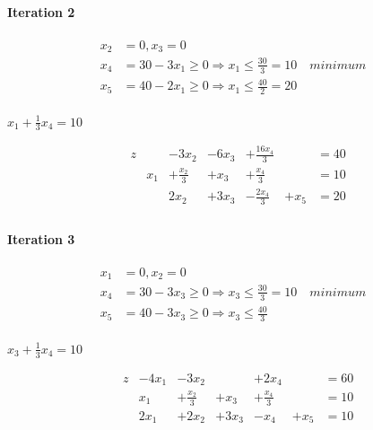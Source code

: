 \documentclass{article}
\begin{document}
\paragraph{Iteration 2}

\begin{equation}
  \begin{aligned}
    x_2 &= 0, x_3 = 0 \\
    x_4 &= 30 - 3x_1 \geq 0 \Rightarrow x_1 \leq \frac{30}{3} = 10 \quad minimum \\
    x_5 &= 40 - 2x_1 \geq 0 \Rightarrow x_1 \leq \frac{40}{2} = 20 \\
  \end{aligned}
\end{equation}

$x_1 + \frac{1}{3}x_4 = 10$

\begin{equation}
  \begin{aligned}
    &z  & &-3x_2  &-6x_3 &+\frac{16x_4}{3}{} & &= 40 \\
    & &x_1  &+\frac{x_2}{3}  &+x_3  &+\frac{x_4}{3}{} & &= 10 \\
    & &  &2x_2  &+3x_3  &-\frac{2x_4}{3}{} &+x_5 &= 20 \\
  \end{aligned}
\end{equation}

\paragraph{Iteration 3}

\begin{equation}
  \begin{aligned}
    x_1 &= 0, x_2 = 0 \\
    x_4 &= 30 - 3x_3 \geq 0 \Rightarrow x_3 \leq \frac{30}{3} = 10 \quad minimum \\
    x_5 &= 40 - 3x_3 \geq 0 \Rightarrow x_3 \leq \frac{40}{3} \\
  \end{aligned}
\end{equation}

$x_3 + \frac{1}{3}x_4 = 10$

\begin{equation}
  \begin{aligned}
    &z  &-4x_1 &-3x_2  & &+2x_4 & &= 60 \\
    & &x_1  &+\frac{x_2}{3}  &+x_3  &+\frac{x_4}{3}{} & &= 10 \\
    & &2x_1  &+2x_2  &+3x_3  &-x_4 &+x_5 &= 10 \\
  \end{aligned}
\end{equation}
  
\end{document}
